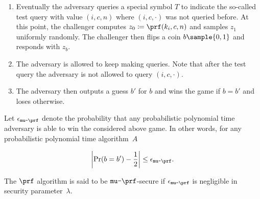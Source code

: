\documentclass{article}
\begin{document}
{\begin{enumerate}
	\item Eventually the adversary queries a special symbol $T$ to indicate the so-called test query with value $(i,c,n)$ where $(i,c,\cdot)$ was not queried before. At this point, the challenger computes $z_0 \coloneqq \prf(k_i, c,n)$ and samples $z_1$ uniformly randomly. The challenger then flips a coin $b \sample \{0, 1\}$ and responds with $z_b$.
	
	\item The adversary is allowed to keep making queries. Note that after the test query the adversary is not allowed to query $(i,c,\cdot)$.
	
	\item The adversary then outputs a guess $b'$ for $b$ and wins the game if $b = b'$ and loses otherwise.
\end{enumerate}

Let $\epsilon_{\texttt{mu-}\prf}$ denote the probability that any probabilistic polynomial time adversary is able to win the considered above game. In other words, for any probabilistic polynomial time algorithm~$A$	

$$
\left \vert \Pr(b = b') - \frac{1}{2} \right \vert \le \epsilon_{\texttt{mu-}\prf}.
$$

The  $\prf$ algorithm is said to be $\texttt{mu-}\prf$-secure if $\epsilon_{\texttt{mu-}\prf}$ is negligible in security parameter~$\lambda$.







}
\end{document}
